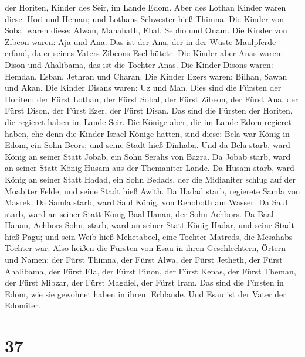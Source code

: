 der Horiten, Kinder des Seir, im Lande Edom.  Aber des
Lothan Kinder waren diese: Hori und Heman; und Lothans Schwester hieß
Thimna.  Die Kinder von Sobal waren diese: Alwan, Manahath,
Ebal, Sepho und Onam.  Die Kinder von Zibeon waren: Aja und
Ana. Das ist der Ana, der in der Wüste Maulpferde erfand, da er seines
Vaters Zibeons Esel hütete.  Die Kinder aber Anas waren:
Dison und Ahalibama, das ist die Tochter Anas.  Die Kinder
Disons waren: Hemdan, Esban, Jethran und Charan.  Die
Kinder Ezers waren: Bilhan, Sawan und Akan.  Die Kinder
Disans waren: Uz und Man.  Dies sind die Fürsten der
Horiten: der Fürst Lothan, der Fürst Sobal, der Fürst Zibeon, der Fürst
Ana,  der Fürst Dison, der Fürst Ezer, der Fürst Disan. Das
sind die Fürsten der Horiten, die regieret haben im Lande Seir.
 Die Könige aber, die im Lande Edom regieret haben, ehe
denn die Kinder Israel Könige hatten, sind diese:  Bela war
König in Edom, ein Sohn Beors; und seine Stadt hieß Dinhaba.
 Und da Bela starb, ward König an seiner Statt Jobab, ein
Sohn Serahs von Bazra.  Da Jobab starb, ward an seiner
Statt König Husam aus der Themaniter Lande.  Da Husam
starb, ward König an seiner Statt Hadad, ein Sohn Bedads, der die
Midianiter schlug auf der Moabiter Felde; und seine Stadt hieß Awith.
 Da Hadad starb, regierete Samla von Masrek. 
Da Samla starb, ward Saul König, von Rehoboth am Wasser. 
Da Saul starb, ward an seiner Statt König Baal Hanan, der Sohn Achbors.
 Da Baal Hanan, Achbors Sohn, starb, ward an seiner Statt
König Hadar, und seine Stadt hieß Pagu; und sein Weib hieß Mehetabeel,
eine Tochter Matreds, die Mesahabs Tochter war.  Also
heißen die Fürsten von Esau in ihren Geschlechtern, Örtern und Namen:
der Fürst Thimna, der Fürst Alwa, der Fürst Jetheth,  der
Fürst Ahalibama, der Fürst Ela, der Fürst Pinon,  der Fürst
Kenas, der Fürst Theman, der Fürst Mibzar,  der Fürst
Magdiel, der Fürst Iram. Das sind die Fürsten in Edom, wie sie gewohnet
haben in ihrem Erblande. Und Esau ist der Vater der Edomiter.

\hypertarget{section-36}{%
\section{37}\label{section-36}}

